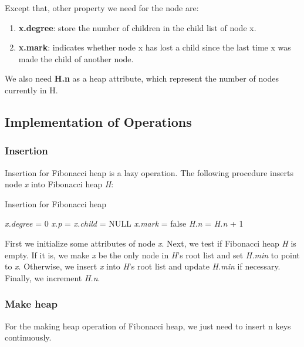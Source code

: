 \documentclass[12pt]{article}
\begin{document}
    Except that, other property we need for the node are:
    \begin{enumerate}
        \setlength{\itemsep}{0pt}
        \item \textbf{x.degree}: store the number of children in the child
        list of node x.
        \item \textbf{x.mark}: indicates whether node x has lost a child 
        since the last time x was made the child of another node.
    \end{enumerate}

    We also need \textbf{H.n} as a heap attribute, which represent the number of nodes currently in H.
    \subsection{Implementation of Operations}
    \subsubsection{Insertion}
    Insertion for Fibonacci heap is a lazy operation. The following procedure inserts node \emph{x} into Fibonacci heap \emph{H}:
    \begin{algorithm}
        \caption{Insertion for Fibonacci heap}
        \LinesNumbered
        \emph{x.degree} = 0\;
        \emph{x.p} = \emph{x.child} = NULL\;
        \emph{x.mark} = false\;
        \emph{H.n} = \emph{H.n} + 1
    \end{algorithm}

    First we initialize some attributes of node \emph{x}. Next, we test if Fibonacci heap \emph{H} is empty. 
    If it is, we make \emph{x} be the only node in \emph{H}’s root list and set \emph{H.min} to point to \emph{x}. 
    Otherwise, we insert \emph{x} into \emph{H}’s root list and update \emph{H.min} if necessary. Finally, we increment \emph{H.n}.

    \subsubsection{Make heap}
    For the making heap operation of Fibonacci heap, we just need 
    to insert n keys continuously.
\end{document}

